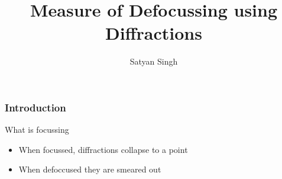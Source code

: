 
\title[]{Measure of Defocussing using Diffractions}
\subtitle{}
\author[]{Satyan Singh}
\date{}
\logo{}
\Large

\def\big#1{\begin{center} \LARGE \textbf{#1} \end{center}}
\def\cen#1{\begin{center}        \textbf{#1} \end{center}}

 { \cwpcover }

\begin{frame} \frametitle{Introduction}
What is focussing

\begin{itemize}
   \item When focussed, diffractions collapse to a point
   \item When defoccused they are smeared out 
\end{itemize}

\end{frame}
\cwpnote{}

